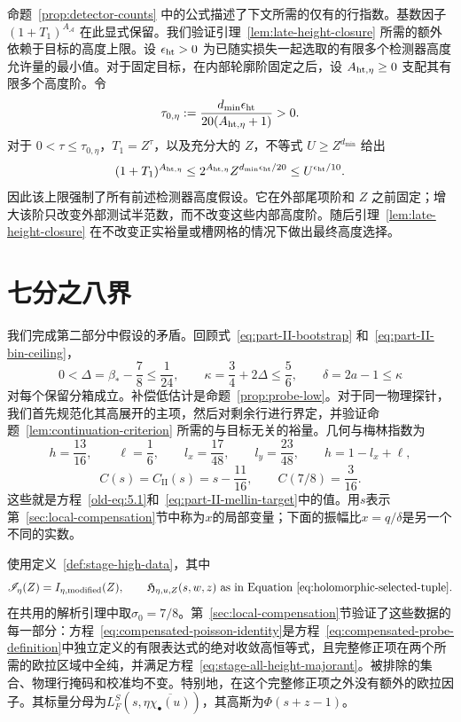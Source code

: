 \documentclass[11pt,a4paper]{article}
\numberwithin{equation}{section}
\numberwithin{figure}{section}
\theoremstyle{definition}
\theoremstyle{remark}
\begin{document}
命题~\ref{prop:detector-counts} 中的公式描述了下文所需的仅有的行指数。基数因子 \((1+T_1)^{A_{\mathcal A}}\) 在此显式保留。我们验证引理~\ref{lem:late-height-closure} 所需的额外依赖于目标的高度上限。设 \(\epsilon_{\rm ht}>0\) 为已随实损失一起选取的有限多个检测器高度允许量的最小值。对于固定目标，在内部轮廓阶固定之后，设 \(A_{{\rm ht},\eta}\ge0\) 支配其有限多个高度阶。令
\[
 \tau_{0,\eta}:=
 \frac{d_{\min}\epsilon_{\rm ht}}{20(A_{{\rm ht},\eta}+1)}>0.
\]
对于 \(0<\tau\le\tau_{0,\eta}\)，\(T_1=Z^\tau\)，以及充分大的 \(Z\)，不等式 \(U\ge Z^{d_{\min}}\) 给出
\[
 (1+T_1)^{A_{{\rm ht},\eta}}
 \le 2^{A_{{\rm ht},\eta}}Z^{d_{\min}\epsilon_{\rm ht}/20}
 \le U^{\epsilon_{\rm ht}/10}.
\]
因此该上限强制了所有前述检测器高度假设。它在外部尾项阶和 \(Z\) 之前固定；增大该阶只改变外部测试半范数，而不改变这些内部高度阶。随后引理~\ref{lem:late-height-closure} 在不改变正实裕量或槽网格的情况下做出最终高度选择。

\section{七分之八界}\label{sec:conclusion}

我们完成第二部分中假设的矛盾。回顾式~\eqref{eq:part-II-bootstrap} 和~\eqref{eq:part-II-bin-ceiling}，
\[
 0<\Delta=\beta_*-\frac78\le\frac1{24},\qquad
 \kappa=\frac34+2\Delta\le\frac56,\qquad
 \delta=2a-1\le\kappa
\]
对每个保留分箱成立。补偿低估计是命题~\ref{prop:probe-low}。对于同一物理探针，我们首先规范化其高展开的主项，然后对剩余行进行界定，并验证命题~\ref{lem:continuation-criterion} 所需的与目标无关的裕量。几何与梅林指数为
\[
 h=\frac{13}{16},\qquad \ell=\frac16,\qquad
 l_x=\frac{17}{48},\qquad l_y=\frac{23}{48},\qquad
 h=1-l_x+\ell,
\]
\[
 C(s)=C_{\mathrm{II}}(s)=s-\frac{11}{16},
 \qquad C(7/8)=\frac3{16}.
\]
这些就是方程~\eqref{old-eq:5.1}和~\eqref{eq:part-II-mellin-target}中的值。用\(s\)表示第~\ref{sec:local-compensation}节中称为\(x\)的局部变量；下面的振幅比\(x=q/\delta\)是另一个不同的实数。

使用定义~\ref{def:stage-high-data}，其中
\[
 \mathscr I_\eta(Z)=I_{\eta,\mathrm{modified}}(Z),\qquad
 \mathfrak H_{\eta,u,Z}(s,w,z)
     \ \text{as in Equation~\eqref{eq:holomorphic-selected-tuple}}.
\]
在共用的解析引理中取\(\sigma_0=7/8\)。第~\ref{sec:local-compensation}节验证了这些数据的每一部分：方程~\eqref{eq:compensated-poisson-identity}是方程~\eqref{eq:compensated-probe-definition}中独立定义的有限表达式的绝对收敛高恒等式，且完整修正项在两个所需的欧拉区域中全纯，并满足方程~\eqref{eq:stage-all-height-majorant}。被排除的集合、物理行掩码和校准均不变。特别地，在这个完整修正项之外没有额外的欧拉因子。其标量分母为\(L_F^S(s,\eta\overline{\chi_\bullet(u)})\)，其高斯为\(\Phi(s+z-1)\)。
\end{document}
